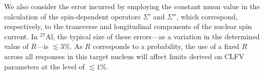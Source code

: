 \documentclass[12pt,letterpaper]{book}
\begin{document}
We also consider the error incurred by employing the constant muon value in the calculation of the spin-dependent operators $\Sigma'$ and $\Sigma''$, which correspond, respectively, to the transverse and longitudinal components of the nuclear spin current. In $^{27}$Al, the typical size of these errors---as a variation in the determined value of $R$---is $\lesssim 3$\%. As $R$ corresponds to a probability, the use of a fixed $R$ across all responses in this target nucleus will affect limits derived on CLFV parameters at the level of $\lesssim 1\%$. 
\end{document}
